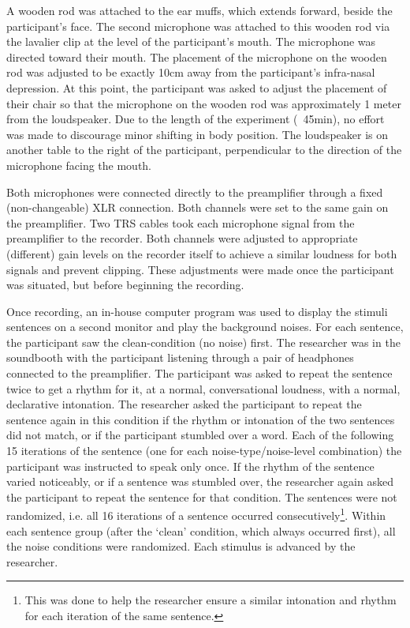 \documentclass[dissertation,copyright]{uathesis}
\begin{document}
A wooden rod was attached to the ear muffs, which extends forward, beside the participant's face.  The second microphone was attached to this wooden rod via the lavalier clip at the level of the participant's mouth.  The microphone was directed toward their mouth. %
The placement of the microphone on the wooden rod was adjusted to be exactly 10cm away from the participant's infra-nasal depression.  At this point, the participant was asked to adjust the placement of their chair so that the microphone on the wooden rod was approximately 1 meter from the loudspeaker. Due to the length of the experiment (~45min), no effort was made to discourage minor shifting in body position.  The loudspeaker is on another table to the right of the participant, perpendicular to the direction of the microphone facing the mouth.

Both microphones were connected directly to the preamplifier through a fixed (non-changeable) XLR connection.  Both channels were set to the same gain on the preamplifier.  Two TRS cables took each microphone signal from the preamplifier to the recorder.  Both channels were adjusted to appropriate (different) gain levels on the recorder itself to achieve a similar loudness for both signals and prevent clipping.  These adjustments were made once the participant was situated, but before beginning the recording.

Once recording, an in-house computer program was used to display the stimuli sentences on a second monitor and play the background noises.  For each sentence, the participant saw the clean-condition (no noise) first.  The researcher was in the soundbooth with the participant listening through a pair of headphones connected to the preamplifier.  The participant was asked to repeat the sentence twice to get a rhythm for it, at a normal, conversational loudness, with a normal, declarative intonation.  The researcher asked the participant to repeat the sentence again in this condition if the rhythm or intonation of the two sentences did not match, or if the participant stumbled over a word.  Each of the following 15 iterations of the sentence (one for each noise-type/noise-level combination) the participant was instructed to speak only once.  If the rhythm of the sentence varied noticeably, or if a sentence was stumbled over, the researcher again asked the participant to repeat the sentence for that condition.  The sentences were not randomized, i.e. all 16 iterations of a sentence occurred consecutively\footnote{This was done to help the researcher ensure a similar intonation and rhythm for each iteration of the same sentence.}. Within each sentence group (after the `clean' condition, which always occurred first), all the noise conditions were randomized. Each stimulus is advanced by the researcher.
\end{document}
